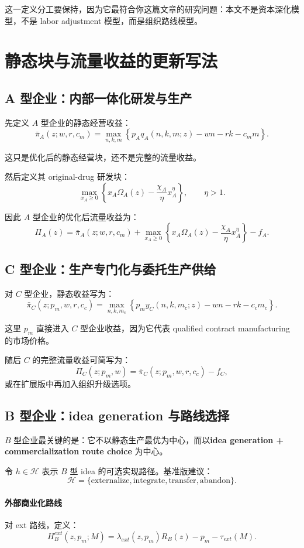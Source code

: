 \documentclass[12pt,fontset=none]{ctexart}
\begin{document}
这一定义分工要保持，因为它最符合你这篇文章的研究问题：本文不是资本深化模型，不是 labor adjustment 模型，而是组织路线模型。

\section{静态块与流量收益的更新写法}

\subsection{A 型企业：内部一体化研发与生产}

先定义 $A$ 型企业的静态经营收益：
\[
\bar\pi_A(z;w,r,c_m)=\max_{n,k,m}\left\{ p_A q_A(n,k,m;z)-wn-rk-c_m m \right\}.
\]

这只是优化后的静态经营块，还不是完整的流量收益。

然后定义其 original-drug 研发块：
\[
\max_{x_A\ge 0}\left\{ x_A\Omega_A(z)-\frac{\chi_A}{\eta}x_A^{\eta}\right\},
\qquad \eta>1.
\]

因此 $A$ 型企业的优化后流量收益为：
\[
\Pi_A(z)=\bar\pi_A(z;w,r,c_m)+\max_{x_A\ge 0}\left\{ x_A\Omega_A(z)-\frac{\chi_A}{\eta}x_A^{\eta}\right\}-f_A.
\]

\subsection{C 型企业：生产专门化与委托生产供给}

对 $C$ 型企业，静态收益写为：
\[
\bar\pi_C(z;p_m,w,r,c_c)=\max_{n,k,m_c}\left\{ p_m y_C(n,k,m_c;z)-wn-rk-c_c m_c\right\}.
\]

这里 $p_m$ 直接进入 $C$ 型企业收益，因为它代表 qualified contract manufacturing 的市场价格。

随后 $C$ 的完整流量收益可简写为：
\[
\Pi_C(z;p_m,w)=\bar\pi_C(z;p_m,w,r,c_c)-f_C,
\]
或在扩展版中再加入组织升级选项。

\subsection{B 型企业：idea generation 与路线选择}

$B$ 型企业最关键的是：它不以静态生产最优为中心，而以\textbf{idea generation + commercialization route choice} 为中心。

令 $h\in\mathcal H$ 表示 $B$ 型 idea 的可选实现路径。基准版建议：
\[
\mathcal H=\{\text{externalize},\text{integrate},\text{transfer},\text{abandon}\}.
\]

\paragraph{外部商业化路线}
对 ext 路线，定义：
\[
H_B^{ext}(z,p_m;M)=\lambda_{ext}(z,p_m)R_B(z)-p_m-\tau_{ext}(M).
\]
\end{document}
